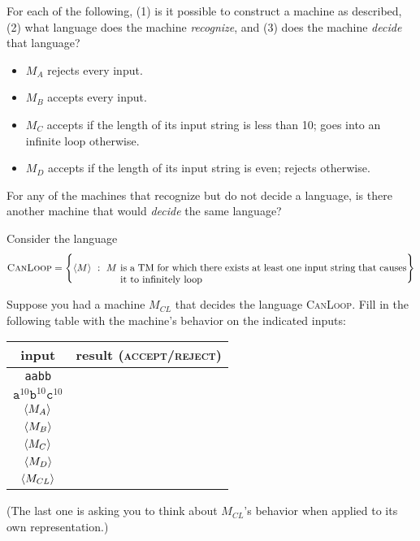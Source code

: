 \documentclass[twoside,letterpaper,openany]{book}
\begin{document}
\begin{exer}
For each of the following, (1) is it possible to construct a machine as described, (2) what language does the machine \emph{recognize}, and (3) does the machine \emph{decide} that language?

\begin{itemize}
\item $M_{A}$  rejects every input.
\item $M_{B}$  accepts every input.
\item $M_{C}$ accepts if the length of its input string is less than 10; goes into an infinite loop otherwise.
\item $M_{D}$ accepts if the length of its input string is even; rejects otherwise.
\end{itemize}

For any of the machines that recognize but do not decide a language, is there another machine that would \emph{decide} the same language?

\end{exer}

\begin{exer}
Consider the language
\[ \textsc{CanLoop} = \setbuild{\repof M}{M~\parbox[t]{4in}{\textrm{is a TM for which there exists at least one input string that causes it to infinitely loop}}} \]

 Suppose you had a machine $M_{CL}$ that decides the language \textsc{CanLoop}. Fill in the following table with the machine's behavior on the indicated inputs:

\begin{center}
\renewcommand{\arraystretch}{1.25}
\begin{tabular}[c]{c|c}
input & result (\textsc{accept}/\textsc{reject}) \\\hline
\texttt{aabb} & \\
$\texttt{a}^{10}\texttt{b}^{10}\texttt{c}^{10}$ & \\
${\langle{M_{A}}\rangle}$ & \\
${\langle{M_{B}}\rangle}$ & \\
${\langle{M_{C}}\rangle}$ & \\
${\langle{M_{D}}\rangle}$ & \\
${\langle{M_{CL}}\rangle}$ & \\
\end{tabular}
\end{center}

(The last one is asking you to think about $M_{CL}$'s behavior when applied to its own representation.)

\end{exer}
\end{document}
